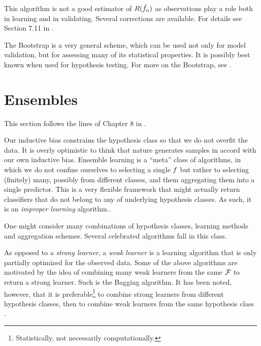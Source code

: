 This algorithm is not a good estimator of $R(\hat{f}_n)$ as observations play a role both in learning and in validating. 
Several corrections are available. For details see Section 7.11 in \cite{hastie_elements_2003}.

The Bootstrap is a very general scheme, which can be used not only for model validation, but for assessing many of its statistical properties. It is possibly best known when used for hypothesis testing. 
For more on the Bootstrap, see \cite{efron_introduction_1994}.


\section{Ensembles}
\label{sec:ensembles}

This section follows the lines of Chapter 8 in \cite{hastie_elements_2003}.

Our inductive bias constrains the hypothesis class so that we do not overfit the data. 
It is overly optimistic to think that nature generates samples in accord with our own inductive bias.
Ensemble learning is a ``meta'' class of algorithms, in which we do not confine ourselves to selecting a single $f$ but rather to selecting (finitely) many, possibly from different classes, and them aggregating them into a single predictor.
This is a very flexible framework that might actually return classifiers that do not belong to any of underlying hypothesis classes. As such, it is an \emph{improper learning} algorithm..

One might consider many combinations of hypothesis classes, learning methods and aggregation schemes.
Several celebrated algorithms fall in this class. 



\begin{remark}
As opposed to a \emph{strong learner}, a \emph{weak learner} is a learning algorithm that is only partially optimized for the observed data. 
Some of the above algorithms are motivated by the idea of combining many weak learners from the same $\mathcal{F}$ to return a strong learner. 
Such is the Bagging algorithm. 
It has been noted, however, that it is preferable\footnote{Statistically, not necessarily computationally.}  to combine strong learners from different hypothesis classes, then to combine weak learners from the same hypothesis class \cite{gashler_decision_2008}.
\end{remark}





